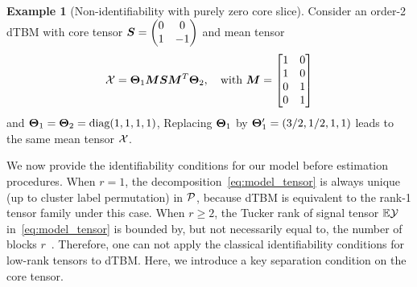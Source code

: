 \documentclass[journal]{IEEEtran}
\theoremstyle{definition}
\theoremstyle{definition}
\newtheorem{example}{Example}
\begin{document}
  \begin{example}[Non-identifiability with purely zero core slice]\label{example:c3} 
 Consider an order-2 dTBM with core tensor $\bm S = \begin{pmatrix} 0 & 0\\
    1 & -1
    \end{pmatrix}$ and mean tensor 
    \begin{equation}
        \mathcal{X} =  \boldsymbol{\Theta}_1 \bm M \bm S   \bm M^T \boldsymbol{\Theta}_2, \quad \text{with } \bm M = \begin{bmatrix} 1 & 0 \\
        1 & 0 \\
        0 & 1 \\
        0 & 1 \\
        \end{bmatrix}
    \end{equation}
    and $ \boldsymbol{\Theta}_1 =\boldsymbol{\Theta}_2= \text{diag}(1,1,1,1)$,
Replacing $\boldsymbol{\Theta}_1$ by $\boldsymbol{\Theta}'_1 = (3/2, 1/2, 1,1)$ leads to the same mean tensor $\mathcal{X}$. 
\end{example}

 \begin{table}[th]
    \centering
    \caption{Parameter space comparison between previous work with our assumption.}
    \label{tab:para}
\end{table}

We now provide the identifiability conditions for our model before estimation procedures. When $r=1$, the decomposition~\eqref{eq:model_tensor} is always unique (up to cluster label permutation) in $\mathcal{P}$, because dTBM is equivalent to the rank-1 tensor family under this case. When $r\geq 2$, the Tucker rank of signal tensor $\mathbb{E}\mathcal{Y}$ in~\eqref{eq:model_tensor} is bounded by, but not necessarily equal to, the number of blocks $r$~\citep{wang2019multiway}. Therefore, one can not apply the classical identifiability conditions for low-rank tensors to dTBM. Here, we introduce a key separation condition on the core tensor. 
\end{document}
